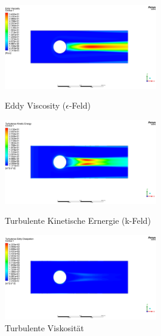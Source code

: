 \begin{figure}
  \centering
  \includegraphics[width=0.6\textwidth]{papers/reynolds/images/eddy-viscosity.png}
  \caption{Eddy Viscosity ($\epsilon$-Feld)}
  \label{fig:e}
  \centering
  \includegraphics[width=0.6\textwidth]{papers/reynolds/images/turbulence-kinetic-energy.png}
  \caption{Turbulente Kinetische Ernergie (k-Feld)}
  \label{fig:k}
  \centering
  \includegraphics[width=0.6\textwidth]{papers/reynolds/images/turbulent-viscosity.png}
  \caption{Turbulente Viskosität}
  \label{fig:mu-t}
\end{figure}